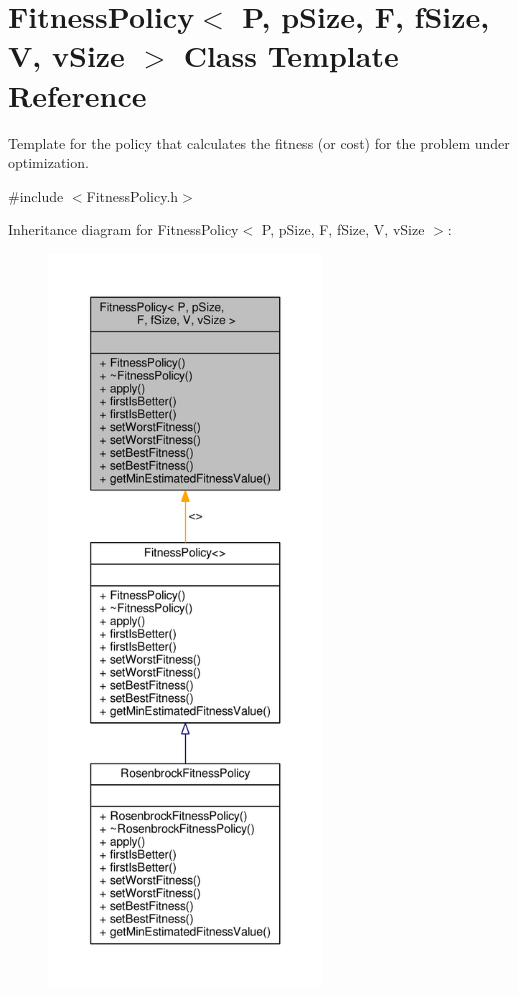 \hypertarget{classFitnessPolicy}{}\section{Fitness\+Policy$<$ P, p\+Size, F, f\+Size, V, v\+Size $>$ Class Template Reference}
\label{classFitnessPolicy}


Template for the policy that calculates the fitness (or cost) for the problem under optimization.  




{\ttfamily \#include $<$Fitness\+Policy.\+h$>$}



Inheritance diagram for Fitness\+Policy$<$ P, p\+Size, F, f\+Size, V, v\+Size $>$\+:\nopagebreak
\begin{figure}[H]
\begin{center}
\leavevmode
\includegraphics[height=550pt]{classFitnessPolicy__inherit__graph}
\end{center}
\end{figure}


